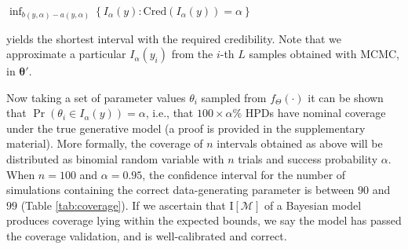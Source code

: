 \documentclass[oneside]{article}
\begin{document}
\begin{center}
  \hspace{0cm}
  $\inf_{b(y, \alpha)-a(y, \alpha)} \left \{ I_\alpha(y) : \text{Cred}(I_\alpha(y)) = \alpha \right\}$
\end{center}



\noindent yields the shortest interval with the required credibility.
Note that we approximate a particular $I_\alpha(y_i)$ from the $i$-th $L$ samples obtained with MCMC, in $\boldsymbol{\theta}'$.

Now taking a set of parameter values $\theta_i$ sampled from $f_\Theta(\cdot)$
it can be shown that
$\operatorname{Pr}\left(\theta_i \in I_\alpha(y) \right) = \alpha$, i.e., that $100\times\alpha$\% HPDs
have nominal coverage under the true generative model (a proof is
provided in the supplementary material).
More formally, the coverage of $n$ intervals obtained as above will be distributed as binomial random variable with $n$ trials and success probability $\alpha$.
When $n=100$ and $\alpha = 0.95$, the confidence interval for the number of simulations containing the correct data-generating parameter is between $90$ and $99$ (Table \ref{tab:coverage}).
If we ascertain that $\text{I}[\mathcal{M}]$ of a Bayesian model produces coverage lying within the expected bounds, we say the model has passed the coverage validation, and is well-calibrated and correct.

%   
\end{document}
